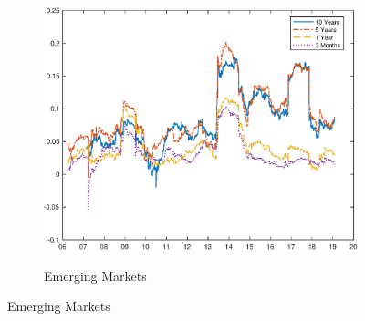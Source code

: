 \documentclass{article}
\begin{document}
	\begin{figure}[tbph]
		\caption{Comovement of Yield Curves: Rolling Correlations} \label{fig:rolling_ts}
		\begin{center}
			\begin{minipage}{0.9\linewidth}
				\begin{center}
					\begin{subfigure}[t]{\linewidth}
						\includegraphics[trim={0cm 0cm 0cm 0cm},clip,height=0.38\textheight,width=\linewidth]{../Figures/Estimation/rolling_dn_data.eps} \\
						\vspace{-0.37cm}
						\caption{Emerging Markets} \label{subfig:rolling_tsEM}
						\vspace{0.4cm}
					\end{subfigure}
					

\end{center}
\end{minipage}
\end{center}
\end{figure}
\end{document}
